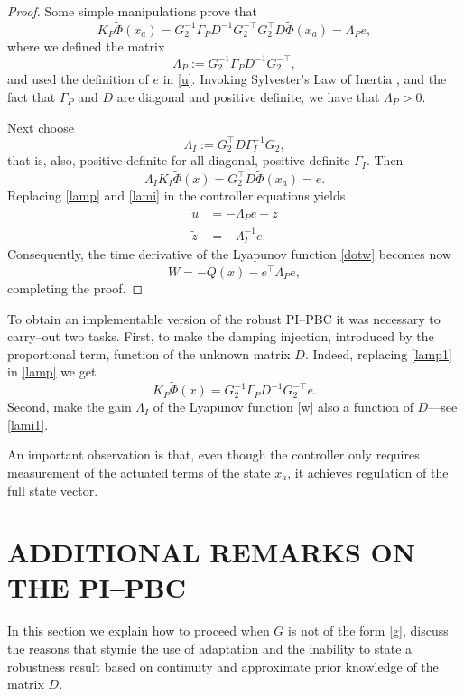 \documentclass[10pt, conference]{ieeeconf}
\def\begequ{\begin{equation}}
\def\endequ{\end{equation}}
\def\lab{\label}
\begin{document}
\begin{proof}
Some simple manipulations prove that
\begin{equation} \label{lamp}
K_P \widetilde{\Phi}(x_a) =  G_2^{-1} \Gamma_P D^{-1} G_2^{-\top}  G_2^\top D  \widetilde{\Phi}(x_a)= \Lambda_P e,
\end{equation}
where we defined the matrix
\begequ
\lab{lamp1}
\Lambda_P := G_2^{-1} \Gamma_P D^{-1} G_2^{-\top},
\endequ
and used the definition of $e$ in \eqref{u}. Invoking Sylvester's Law of Inertia \cite{LANTIS}, and the fact that $\Gamma_P$ and $D$ are diagonal and positive definite, we have that $\Lambda_P>0$. 

Next choose
\begequ
\lab{lami1}
\Lambda_I := G_2^\top D \Gamma_I^{-1} G_2,
\endequ
that is, also, positive definite for all diagonal, positive definite $\Gamma_I$. Then
\begin{equation} \label{lami}
	\Lambda_I K_I \widetilde{\Phi}(x) = G_2^\top D \widetilde{\Phi}(x_a) =e.
\end{equation}
Replacing \eqref{lamp} and \eqref{lami} in the controller equations yields
\begin{equation*}
	\begin{aligned}
		\tilde u &= - \Lambda_P e + \tilde z \\
		\dot{\tilde z} &= - \Lambda_I^{-1} e.
	\end{aligned}
\end{equation*}
Consequently, the time derivative of the Lyapunov function \eqref{dotw} becomes now
\begequ
\lab{dotw1}
	\dot{W} = -Q(x) - e^\top \Lambda_P e,
\endequ
completing the proof.
\end{proof}

To obtain an implementable version of the robust PI--PBC it was necessary to carry--out two tasks. First, to make the damping injection, introduced by the proportional term, function of the unknown matrix $D$. Indeed, replacing \eqref{lamp1} in \eqref{lamp} we get
$$
K_P \widetilde{\Phi}(x)=G_2^{-1} \Gamma_P D^{-1} G_2^{-\top}e.
$$
Second, make the gain $\Lambda_I$ of the Lyapunov function \eqref{w} also a function of $D$---see \eqref{lami1}. 

An important observation is that, even though the controller only requires measurement of the actuated terms of the state $x_a$,  it achieves regulation of the full state vector.
\section{ADDITIONAL REMARKS ON THE PI--PBC}
\lab{sec5}	
In this section we explain how to proceed when $G$ is not of the form \eqref{g}, discuss the reasons that stymie the use of adaptation and the inability to state a robustness result based on continuity and approximate prior knowledge of the matrix $D$.
\end{document}
